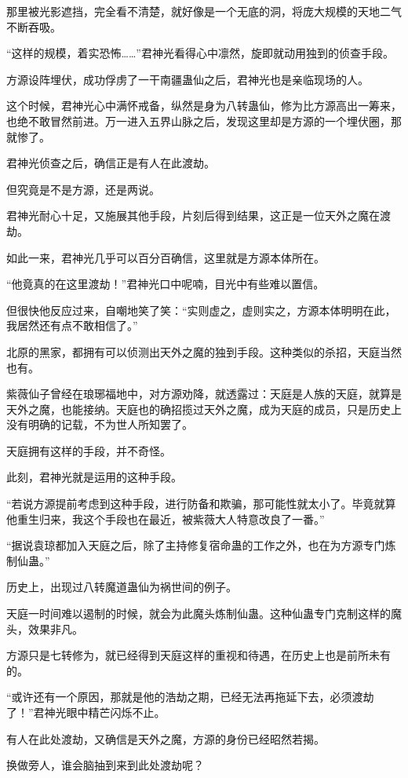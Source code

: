 \begin{this_body}
那里被光影遮挡，完全看不清楚，就好像是一个无底的洞，将庞大规模的天地二气不断吞吸。

“这样的规模，着实恐怖……”君神光看得心中凛然，旋即就动用独到的侦查手段。

方源设阵埋伏，成功俘虏了一干南疆蛊仙之后，君神光也是亲临现场的人。

这个时候，君神光心中满怀戒备，纵然是身为八转蛊仙，修为比方源高出一筹来，也绝不敢冒然前进。万一进入五界山脉之后，发现这里却是方源的一个埋伏圈，那就惨了。

君神光侦查之后，确信正是有人在此渡劫。

但究竟是不是方源，还是两说。

君神光耐心十足，又施展其他手段，片刻后得到结果，这正是一位天外之魔在渡劫。

如此一来，君神光几乎可以百分百确信，这里就是方源本体所在。

“他竟真的在这里渡劫！”君神光口中呢喃，目光中有些难以置信。

但很快他反应过来，自嘲地笑了笑：“实则虚之，虚则实之，方源本体明明在此，我居然还有点不敢相信了。”

北原的黑家，都拥有可以侦测出天外之魔的独到手段。这种类似的杀招，天庭当然也有。

紫薇仙子曾经在琅琊福地中，对方源劝降，就透露过：天庭是人族的天庭，就算是天外之魔，也能接纳。天庭也的确招揽过天外之魔，成为天庭的成员，只是历史上没有明确的记载，不为世人所知罢了。

天庭拥有这样的手段，并不奇怪。

此刻，君神光就是运用的这种手段。

“若说方源提前考虑到这种手段，进行防备和欺骗，那可能性就太小了。毕竟就算他重生归来，我这个手段也在最近，被紫薇大人特意改良了一番。”

“据说袁琼都加入天庭之后，除了主持修复宿命蛊的工作之外，也在为方源专门炼制仙蛊。”

历史上，出现过八转魔道蛊仙为祸世间的例子。

天庭一时间难以遏制的时候，就会为此魔头炼制仙蛊。这种仙蛊专门克制这样的魔头，效果非凡。

方源只是七转修为，就已经得到天庭这样的重视和待遇，在历史上也是前所未有的。

“或许还有一个原因，那就是他的浩劫之期，已经无法再拖延下去，必须渡劫了！”君神光眼中精芒闪烁不止。

有人在此处渡劫，又确信是天外之魔，方源的身份已经昭然若揭。

换做旁人，谁会脑抽到来到此处渡劫呢？


\end{this_body}
